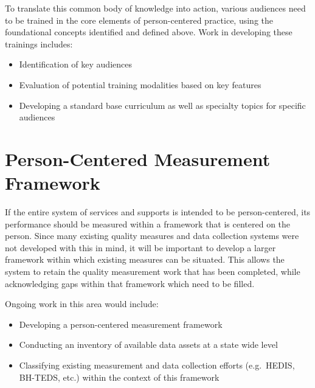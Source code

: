 \documentclass[
]{book}
\providecommand{\tightlist}{%
  \setlength{\itemsep}{0pt}\setlength{\parskip}{0pt}}
\begin{document}
To translate this common body of knowledge into action, various audiences need to be trained in the core elements of person-centered practice, using the foundational concepts identified and defined above. Work in developing these trainings includes:

\begin{itemize}
\tightlist
\item
  Identification of key audiences
\item
  Evaluation of potential training modalities based on key features
\item
  Developing a standard base curriculum as well as specialty topics for specific audiences
\end{itemize}

\hypertarget{measure}{%
\chapter{Person-Centered Measurement Framework}\label{measure}}

If the entire system of services and supports is intended to be person-centered, its performance should be measured within a framework that is centered on the person. Since many existing quality measures and data collection systems were not developed with this in mind, it will be important to develop a larger framework within which existing measures can be situated. This allows the system to retain the quality measurement work that has been completed, while acknowledging gaps within that framework which need to be filled.

Ongoing work in this area would include:

\begin{itemize}
\tightlist
\item
  Developing a person-centered measurement framework
\item
  Conducting an inventory of available data assets at a state wide level
\item
  Classifying existing measurement and data collection efforts (e.g.~HEDIS, BH-TEDS, etc.) within the context of this framework
\end{itemize}

  
\end{document}
